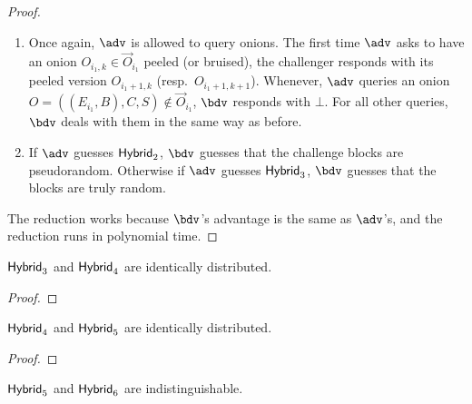 \documentclass[runningheads,a4paper]{llncs}
\begin{document}
\begin{proof}
\begin{enumerate}
\item Once again, $\adv$ is allowed to query onions. 
The first time $\adv$ asks to have an onion $O_{i_1, k} \in \vec{O}_{i_1}$ peeled (or bruised), the challenger responds with its peeled version $O_{i_1+1, k}$ (resp.~$O_{i_1+1, k+1}$). 
Whenever, $\adv$ queries an onion $O = ((E_{i_1}, B), C, S) \not\in \vec{O}_{i_1}$, $\bdv$ responds with $\bot$. 
For all other queries, $\bdv$ deals with them in the same way as before. 

\item If $\adv$ guesses $\mathsf{Hybrid}_{2}$, $\bdv$ guesses that the challenge blocks are pseudorandom. Otherwise if $\adv$ guesses $\mathsf{Hybrid}_{3}$, $\bdv$ guesses that the blocks are truly random. 
\end{enumerate}
The reduction works because $\bdv$'s advantage is the same as $\adv$'s, and the reduction runs in polynomial time. 
\end{proof}

\iffalse
\begin{lemma}
$\mathsf{Hybrid}_{3}$ and $\mathsf{Hybrid}_{4}$ are identically distributed. 
\end{lemma}

\begin{proof}
\end{proof}

\begin{lemma}
$\mathsf{Hybrid}_{4}$ and $\mathsf{Hybrid}_{5}$ are identically distributed. 
\end{lemma}

\begin{proof}
\end{proof}


\begin{lemma}
$\mathsf{Hybrid}_{5}$ and $\mathsf{Hybrid}_{6}$ are indistinguishable. 
\end{lemma}
\end{document}
